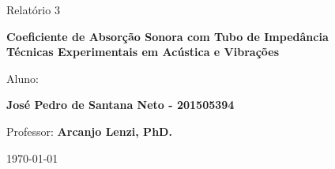 {\begin{capa}
\begin{figure}[!ht]
\begin{minipage}[c]{0.78\textwidth}
\begin{minipage}[t]{1\linewidth}
		\vspace{2cm}
		\Huge Relatório 3
		
	
		\vspace{1cm}
		 \textbf{Coeficiente de Absorção Sonora com Tubo de Impedância\\
		 	\Large{Técnicas Experimentais em Acústica e Vibrações}}
		
		\vspace{6cm}
		
		\large
		Aluno:
		
		\textbf{José Pedro de Santana Neto - 201505394}\\
		
		\vspace{6cm}
		
		
		\large
		Professor:
		\textbf{Arcanjo Lenzi, PhD.}
		
		
		\vspace{3cm}
		\vfill
		
		\today 
  \end{minipage}
\end{minipage}
\end{figure}	
	
\end{capa}

\restoregeometry








}
